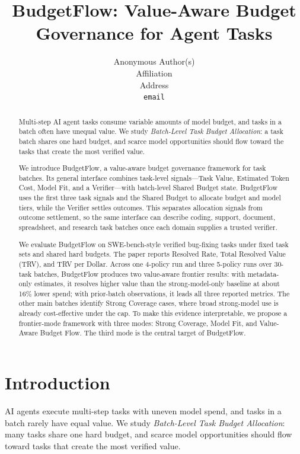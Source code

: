 \documentclass[letterpaper]{article}
\title{BudgetFlow: Value-Aware Budget Governance for Agent Tasks}
\author{
    Anonymous Author(s)\\
    Affiliation\\
    Address\\
    \texttt{email}
}
\newcommand{\method}{BudgetFlow\xspace}
\newcommand{\trv}{TRV\xspace}
\newcommand{\taskvalue}{Task Value\xspace}
\newcommand{\tokencost}{Estimated Token Cost\xspace}
\newcommand{\modelfit}{Model Fit\xspace}
\newcommand{\sharedbudget}{Shared Budget\xspace}
\newcommand{\verifier}{Verifier\xspace}
\begin{document}
\maketitle

\begin{abstract}
Multi-step AI agent tasks consume variable amounts of model budget, and tasks in a batch often have unequal value. We study \emph{Batch-Level Task Budget Allocation}: a task batch shares one hard budget, and scarce model opportunities should flow toward the tasks that create the most verified value.

We introduce \method, a value-aware budget governance framework for task batches. Its general interface combines task-level signals---\taskvalue, \tokencost, \modelfit, and a \verifier---with batch-level \sharedbudget state. \method uses the first three task signals and the \sharedbudget to allocate budget and model tiers, while the \verifier settles outcomes. This separates allocation signals from outcome settlement, so the same interface can describe coding, support, document, spreadsheet, and research task batches once each domain supplies a trusted verifier.

We evaluate \method on SWE-bench-style verified bug-fixing tasks under fixed task sets and shared hard budgets. The paper reports Resolved Rate, Total Resolved Value (\trv), and \trv per Dollar. Across one 4-policy run and three 5-policy runs over 30-task batches, \method produces two value-aware frontier results: with metadata-only estimates, it resolves higher value than the strong-model-only baseline at about 16\% lower spend; with prior-batch observations, it leads all three reported metrics. The other main batches identify Strong Coverage cases, where broad strong-model use is already cost-effective under the cap. To make this evidence interpretable, we propose a frontier-mode framework with three modes: Strong Coverage, Model Fit, and Value-Aware Budget Flow. The third mode is the central target of \method.
\end{abstract}

\section{Introduction}
AI agents execute multi-step tasks with uneven model spend, and tasks in a batch rarely have equal value. We study \emph{Batch-Level Task Budget Allocation}: many tasks share one hard budget, and scarce model opportunities should flow toward tasks that create the most verified value.
\end{document}
